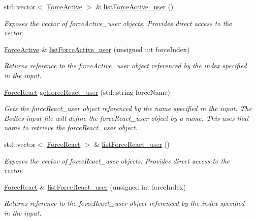 \begin{DoxyCompactItemize}
std\-::vector$<$ \hyperlink{classosea_1_1ofreq_1_1_force_active}{Force\-Active} $>$ \& \hyperlink{classosea_1_1ofreq_1_1_system_ac50ce91b4ad00fd7748c316ba5fe70a6}{list\-Force\-Active\-\_\-user} ()
\begin{DoxyCompactList}\small\item\em Exposes the vector of force\-Active\-\_\-user objects. Provides direct access to the vector. \end{DoxyCompactList}\item 
\hyperlink{classosea_1_1ofreq_1_1_force_active}{Force\-Active} \& \hyperlink{classosea_1_1ofreq_1_1_system_a6166a2799a6b6419f5a91d90c98851a5}{list\-Force\-Active\-\_\-user} (unsigned int force\-Index)
\begin{DoxyCompactList}\small\item\em Returns reference to the force\-Active\-\_\-user object referenced by the index specified in the input. \end{DoxyCompactList}\item 
\hyperlink{classosea_1_1ofreq_1_1_force_react}{Force\-React} \hyperlink{classosea_1_1ofreq_1_1_system_a7693db0ab139a544d66d58376dc44862}{getforce\-React\-\_\-user} (std\-::string force\-Name)
\begin{DoxyCompactList}\small\item\em Gets the force\-React\-\_\-user object referenced by the name specified in the input. The Bodies input file will define the force\-React\-\_\-user object by a name. This uses that name to retrieve the force\-React\-\_\-user object. \end{DoxyCompactList}\item 
std\-::vector$<$ \hyperlink{classosea_1_1ofreq_1_1_force_react}{Force\-React} $>$ \& \hyperlink{classosea_1_1ofreq_1_1_system_a5f567e325139744bc80fd1653b50b0e3}{list\-Force\-React\-\_\-user} ()
\begin{DoxyCompactList}\small\item\em Exposes the vector of force\-React\-\_\-user objects. Provides direct access to the vector. \end{DoxyCompactList}\item 
\hyperlink{classosea_1_1ofreq_1_1_force_react}{Force\-React} \& \hyperlink{classosea_1_1ofreq_1_1_system_a863fea51fba8362e69486bdfdf632ccb}{list\-Force\-React\-\_\-user} (unsigned int force\-Index)
\begin{DoxyCompactList}\small\item\em Returns reference to the force\-React\-\_\-user object referenced by the index specified in the input. \end{DoxyCompactList}\item 

\end{DoxyCompactItemize}
